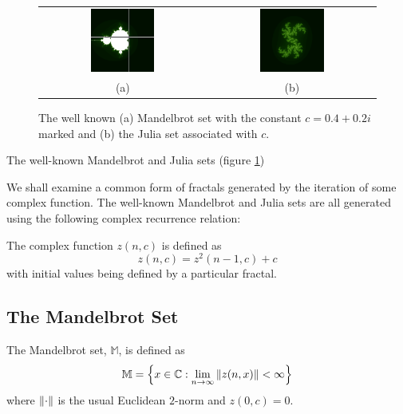 \begin{figure}
\centering
\begin{tabular}{c@{$\quad$}c}
\includegraphics[width=0.4\textwidth]{euc_mandel_julia_pos} 
 & \includegraphics[width=0.4\textwidth]{julia_euc} \\
                          (a) & (b)
\end{tabular}
\caption{\label{fig:euclidean_sets}The well known (a) Mandelbrot set with
  the constant $c = 0.4 + 0.2i$ marked and (b) the Julia
  set associated with $c$.}
\end{figure}

The well-known Mandelbrot and Julia sets (figure \ref{fig:euclidean_sets}) 

We shall examine a common form of fractals generated by the iteration
of some complex function. The well-known 
Mandelbrot
and Julia sets\cite{FRAC:Mandelbrot, FRAC:JuliaMandelBook} are all
generated using the following complex recurrence relation:
\begin{definition}
The complex function $z(n,c)$ is defined as
\[
z(n,c) = z^2(n-1,c) + c
\]
with initial values being defined by a particular fractal.
\end{definition}

\subsection{The Mandelbrot Set}

\begin{definition}
The Mandelbrot set, $\mathbb{M}$, is defined as
\[
\mathbb{M} = 
\left\{x \in \mathbb{C} 
: \lim_{n \rightarrow \infty} \left\Vert z(n,x) \right\Vert < \infty \right\} 
\]
where $\left\Vert \cdot \right\Vert$ is the usual Euclidean $2$-norm and $z(0,c) = 0$.
\end{definition}

